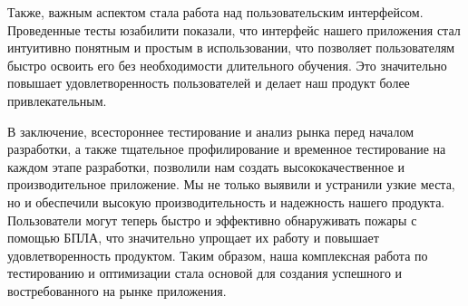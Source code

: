     Также, важным аспектом стала работа над пользовательским интерфейсом. Проведенные тесты юзабилити показали, что интерфейс нашего приложения стал интуитивно понятным и простым в использовании, что позволяет пользователям быстро освоить его без необходимости длительного обучения. Это значительно повышает удовлетворенность пользователей и делает наш продукт более привлекательным.

    В заключение, всестороннее тестирование и анализ рынка перед началом разработки, а также тщательное профилирование и временное тестирование на каждом этапе разработки, позволили нам создать высококачественное и производительное приложение. Мы не только выявили и устранили узкие места, но и обеспечили высокую производительность и надежность нашего продукта. Пользователи могут теперь быстро и эффективно обнаруживать пожары с помощью БПЛА, что значительно упрощает их работу и повышает удовлетворенность продуктом. Таким образом, наша комплексная работа по тестированию и оптимизации стала основой для создания успешного и востребованного на рынке приложения.

\endinput